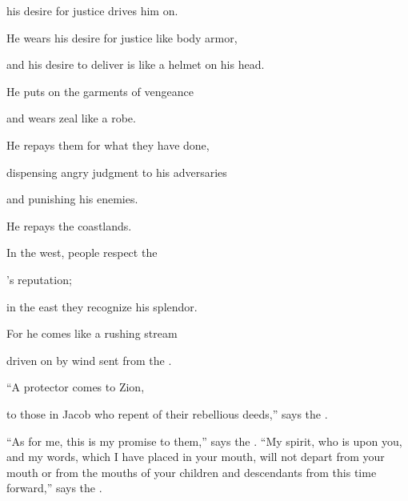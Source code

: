 {\par }{\Q his desire
for justice
drives him on.
\par }{\Q {}He wears
his desire for justice
like body armor,
\par }{\Q and his desire to deliver
is like a helmet
on his head.
\par }{\Q He puts on
the garments
of vengeance
\par }{\Q and wears
zeal
like a robe.
\par }{\Q {}He repays
them for what they have done,
\par }{\Q dispensing
angry
judgment
to his adversaries
\par }{\Q and punishing
his enemies.
\par }{\Q He repays
the coastlands.
\par }{\Q {}In the west,
people respect
the

{}’s
reputation;
\par }{\Q in the east
they recognize his splendor.
\par }{\Q For
he comes
like a rushing
stream
\par }{\Q driven
on by wind
sent from the
{}.
\par }{\Q {}“A protector
comes
to Zion,
\par }{\Q to those in Jacob
who repent
of their rebellious
deeds,” says
the {}.
\par }{\PP {}“As for me,
this
is my promise
to them,”
says
the {}. “My spirit,
who
is upon
you, and my words,
which
I have placed
in your mouth,
will not
depart
from your
mouth
or from the mouths of your
children
and descendants
from this time forward,”
says
the {}.

\par }
